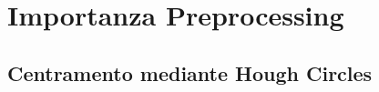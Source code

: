 












\section{Importanza Preprocessing}

%

\subsection {Centramento mediante Hough Circles}
